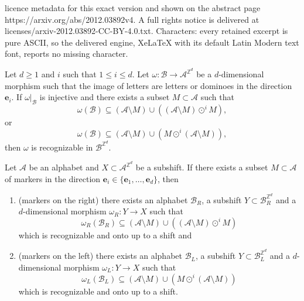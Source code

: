 \documentclass[10pt,a4paper]{amsart}
\newcommand{\Acal}{\mathcal{A}} %
\newcommand{\Bcal}{\mathcal{B}}
\newcommand{\Z}{\mathbb{Z}}
\newcommand{\be}{{\boldsymbol{e}}}
\begin{document}
licence metadata for this exact version and shown on the abstract page https://arxiv.org/abs/2012.03892v4. A full rights notice is delivered at licenses/arxiv-2012.03892-CC-BY-4.0.txt. Characters: every retained excerpt is pure ASCII, so the delivered engine, XeLaTeX with its default Latin Modern text font, reports no missing character.
\begin{lemma}\label{lem:recognizable}
    Let $d\geq1$ and $i$ such that $1\leq i\leq d$.
Let $\omega:\Bcal\to\Acal^{\Z^d}$ be a $d$-dimensional morphism such that
the image of letters are letters or dominoes in the direction $\be_i$.
If $\omega|_\Bcal$ is injective and there exists a subset $M\subset \Acal$ such that
\begin{equation}\label{eq:markers-on-right}
    \omega(\Bcal)
    \subseteq (\Acal\setminus M)
    \cup \left((\Acal\setminus M)\odot^i M\right),
\end{equation}
or
\begin{equation}\label{eq:markers-on-left}
    \omega(\Bcal)
    \subseteq (\Acal\setminus M)
    \cup \left(M\odot^i (\Acal\setminus M)\right),
\end{equation}
    then $\omega$ is recognizable in $\Bcal^{\Z^d}$.
\end{lemma}

\begin{theorem}\label{thm:if-markers-desubstitute}
    Let $\Acal$ be an alphabet
    and $X\subset\Acal^{\Z^d}$ be a subshift.
    If there exists a subset
    $M\subset\Acal$ 
    of markers in the direction 
    $\be_i\in\{\be_1,\dots,\be_d\}$,
    then 
\begin{enumerate}%
    \item[(i)] (markers on the right) there exists an alphabet $\Bcal_R$,
    a subshift $Y\subset\Bcal_R^{\Z^d}$
    and a $d$-dimensional morphism
    $\omega_R:Y\to X$
    such that 
    \begin{equation*}
        \omega_R(\Bcal_R)\subseteq (\Acal\setminus M)\cup 
        \left((\Acal\setminus M)\odot^i M\right)
    \end{equation*}
    which is recognizable and onto up to a shift and
\item[(ii)] (markers on the left) there exists an alphabet $\Bcal_L$,
    a subshift $Y\subset\Bcal_L^{\Z^d}$
    and a $d$-dimensional morphism
    $\omega_L:Y\to X$
    such that 
    \begin{equation*}
        \omega_L(\Bcal_L)\subseteq (\Acal\setminus M)\cup 
        \left(M\odot^i (\Acal\setminus M)\right)
    \end{equation*}
    which is recognizable and onto up to a shift.
\end{enumerate}
\end{theorem}
\end{document}
